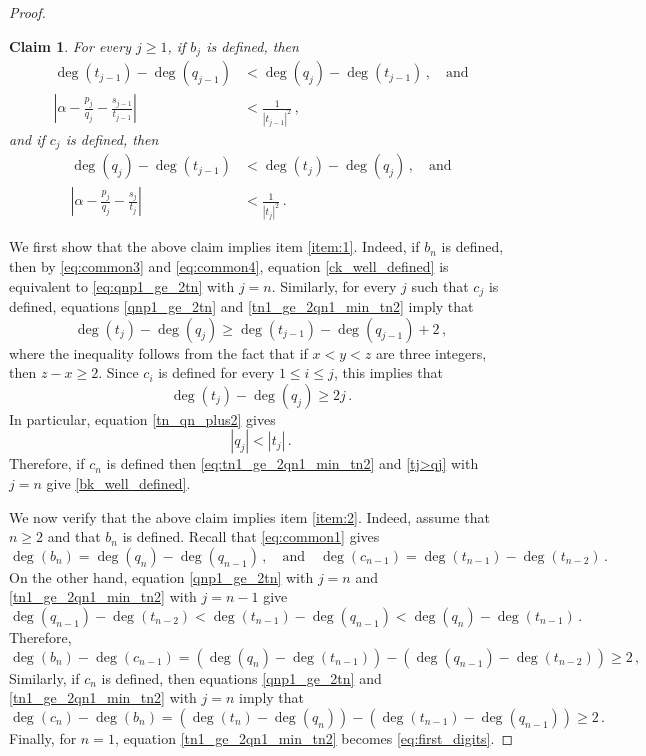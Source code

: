 \documentclass[a4paper,12pt]{article}
\newtheorem*{claim*}{Claim}
\begin{document}
\begin{proof}
\begin{claim*}
For every $j\geq1$, if $b_j$ is defined, then
\begin{align}
\label{qnp1_ge_2tn}
\deg(t_{j-1})-\deg(q_{j-1}) &< \deg(q_{j}) - \deg(t_{j-1})\,,\quad\textrm{and}\\
\label{eq:qnp1_ge_2tn}
\left|\alpha - \frac{p_{j}}{q_{j}} - \frac{s_{j-1}}{t_{j-1}}\right| &< \frac{1}{|t_{j-1}|^2}\,,
\end{align}
and if $c_j$ is defined, then
\begin{align}
\label{tn1_ge_2qn1_min_tn2}
\deg(q_{j})-\deg(t_{j-1}) &< \deg(t_{j}) - \deg(q_{j})\,,\quad\textrm{and}\\
\label{eq:tn1_ge_2qn1_min_tn2}
\left|\alpha - \frac{p_{j}}{q_{j}} - \frac{s_j}{t_j}\right| &< \frac{1}{|t_j|^2}\,.
\end{align}
\end{claim*}
We first show that the above claim implies item \ref{item:1}. Indeed, 
if $b_n$ is defined, then by \eqref{eq:common3} and \eqref{eq:common4}, equation \eqref{ck_well_defined} is equivalent to \eqref{eq:qnp1_ge_2tn} with $j=n$. Similarly, for every $j$ such that $c_j$ is defined, equations \eqref{qnp1_ge_2tn} and \eqref{tn1_ge_2qn1_min_tn2} imply that 
\begin{equation*}
\deg(t_{j})-\deg(q_{j})\geq \deg(t_{j-1})-\deg(q_{j-1})+2\,,
\end{equation*}
where the inequality follows from the fact that if $x<y<z$ are three integers, then $z-x\geq2$. Since $c_i$ is defined for every $1\leq i \leq j$, this implies that
\begin{equation}
\label{tn_qn_plus2}
\deg(t_{j})-\deg(q_{j})\ge 2j\,.
\end{equation}
In particular, equation \eqref{tn_qn_plus2} gives 
\begin{equation}
\label{tj>qj}
|q_j|<|t_j|\,.
\end{equation}
Therefore, if $c_n$ is defined then \eqref{eq:tn1_ge_2qn1_min_tn2} and \eqref{tj>qj} with $j=n$ give \eqref{bk_well_defined}.

We now verify that the above claim implies item \ref{item:2}. Indeed, assume that $n\geq2$ and that $b_n$ is defined. Recall that \eqref{eq:common1} gives 
\begin{equation*}
    \deg(b_n)=\deg(q_n)-\deg(q_{n-1})\,,\quad\textrm{and}\quad \deg(c_{n-1})=\deg(t_{n-1})-\deg(t_{n-2})\,. 
\end{equation*}
On the other hand, equation \eqref{qnp1_ge_2tn} with $j=n$ and \eqref{tn1_ge_2qn1_min_tn2} with $j=n-1$ give
$$
\deg(q_{n-1})-\deg(t_{n-2}) < \deg(t_{n-1}) - \deg(q_{n-1}) < \deg(q_{n})-\deg(t_{n-1})\,.
$$
Therefore, 
$$
\deg(b_{n})-\deg(c_{n-1}) = (\deg(q_{n}) - \deg(t_{n-1})) - (\deg(q_{n-1}) - \deg(t_{n-2}))\geq2\,,
$$
Similarly, if $c_n$ is defined, then equations \eqref{qnp1_ge_2tn} and \eqref{tn1_ge_2qn1_min_tn2} with $j=n$ imply that
$$
\deg(c_{n})-\deg(b_{n}) = (\deg(t_{n}) - \deg(q_{n})) - (\deg(t_{n-1}) - \deg(q_{n-1}))\geq2\,.
$$
Finally, for $n=1$, equation \eqref{tn1_ge_2qn1_min_tn2} becomes \eqref{eq:first_digits}.


\end{proof}
\end{document}
